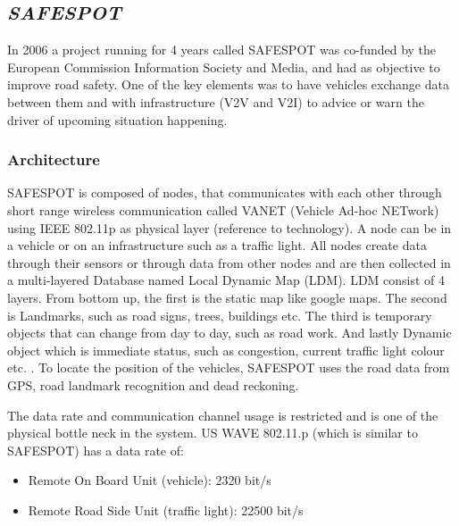 \subsection{\textit{SAFESPOT}}
In 2006 a project running for 4 years called SAFESPOT \cite{Safespot} was co-funded by the European Commission Information Society and Media, and had as objective to improve road safety. One of the key elements was to have vehicles exchange data between them and with infrastructure (V2V and V2I) to advice or warn the driver of upcoming situation happening.\par
% 
\subsubsection{Architecture}
SAFESPOT is composed of nodes, that communicates with each other through short range wireless communication called VANET (Vehicle Ad-hoc NETwork) using IEEE 802.11p as physical layer (reference to technology). A node can be in a vehicle or on an infrastructure such as a traffic light. All nodes create data through their sensors or through data from other nodes and are then collected in a multi-layered Database named Local Dynamic Map (LDM).
LDM consist of 4 layers. From bottom up, the first is the static map like google maps. The second is Landmarks, such as road signs, trees, buildings etc. The third is temporary objects that can change from day to day, such as road work. And lastly Dynamic object which is immediate status, such as congestion, current traffic light colour etc. \cite{Brignolo2008UseProject}.
To locate the position of the vehicles, SAFESPOT uses the road data from GPS, road landmark recognition and dead reckoning\footnotemark.\par
%
% 
% 
% 
The data rate and communication channel usage is restricted and is one of the physical bottle neck in the system. US WAVE 802.11.p (which is similar to SAFESPOT) has a data rate of:
\begin{itemize}[noitemsep]
    \item Remote On Board Unit (vehicle): 2320 bit/s
    \item Remote Road Side Unit (traffic light): 22500 bit/s  
\end{itemize}

